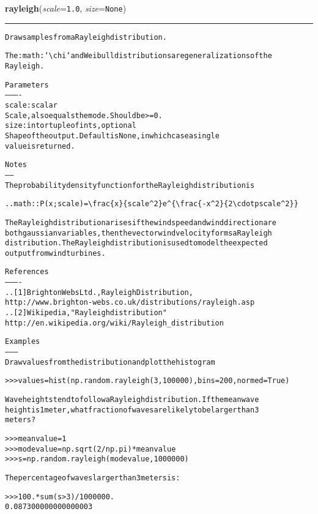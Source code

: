 \hspace{.8\funcindent}\begin{boxedminipage}{\funcwidth}

    \raggedright \textbf{rayleigh}(\textit{scale}={\tt 1.0}, \textit{size}={\tt None})

    \vspace{-1.5ex}

    \rule{\textwidth}{0.5\fboxrule}
\setlength{\parskip}{2ex}
\begin{alltt}
Draw samples from a Rayleigh distribution.

The :math:`{\textbackslash}chi` and Weibull distributions are generalizations of the
Rayleigh.

Parameters
----------
scale : scalar
    Scale, also equals the mode. Should be {\textgreater}= 0.
size : int or tuple of ints, optional
    Shape of the output. Default is None, in which case a single
    value is returned.

Notes
-----
The probability density function for the Rayleigh distribution is

.. math:: P(x;scale) = {\textbackslash}frac\{x\}\{scale{\textasciicircum}2\}e{\textasciicircum}\{{\textbackslash}frac\{-x{\textasciicircum}2\}\{2 {\textbackslash}cdotp scale{\textasciicircum}2\}\}

The Rayleigh distribution arises if the wind speed and wind direction are
both gaussian variables, then the vector wind velocity forms a Rayleigh
distribution. The Rayleigh distribution is used to model the expected
output from wind turbines.

References
----------
..[1] Brighton Webs Ltd., Rayleigh Distribution,
      http://www.brighton-webs.co.uk/distributions/rayleigh.asp
..[2] Wikipedia, "Rayleigh distribution"
      http://en.wikipedia.org/wiki/Rayleigh\_distribution

Examples
--------
Draw values from the distribution and plot the histogram

{\textgreater}{\textgreater}{\textgreater} values = hist(np.random.rayleigh(3, 100000), bins=200, normed=True)

Wave heights tend to follow a Rayleigh distribution. If the mean wave
height is 1 meter, what fraction of waves are likely to be larger than 3
meters?

{\textgreater}{\textgreater}{\textgreater} meanvalue = 1
{\textgreater}{\textgreater}{\textgreater} modevalue = np.sqrt(2 / np.pi) * meanvalue
{\textgreater}{\textgreater}{\textgreater} s = np.random.rayleigh(modevalue, 1000000)

The percentage of waves larger than 3 meters is:

{\textgreater}{\textgreater}{\textgreater} 100.*sum(s{\textgreater}3)/1000000.
0.087300000000000003
\end{alltt}

\setlength{\parskip}{1ex}
    \end{boxedminipage}

